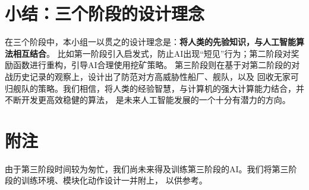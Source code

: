 \documentclass{article}
\begin{document}
\section{小结：三个阶段的设计理念}
在三个阶段中，本小组一以贯之的设计理念是：\textbf{将人类的先验知识，与人工智能算法相互结合}。
比如第一阶段引入启发式，防止AI出现“短见”行为；第二阶段对奖励函数进行重构，引导AI合理使用挖矿策略。
第三阶段则在基于对第二阶段的对战历史记录的观察上，设计出了防范对方高威胁性船厂、舰队，以及
回收无家可归舰队的策略。我们相信，将人类的经验智慧，与计算机的强大计算能力结合，并不断开发更高效稳健的算法，
是未来人工智能发展的一个十分有潜力的方向。

\section*{附注}
由于第三阶段时间较为匆忙，我们尚未来得及训练第三阶段的AI。我们将第三阶段的训练环境、模块化动作设计一并附上，
以供参考。
\end{document}
